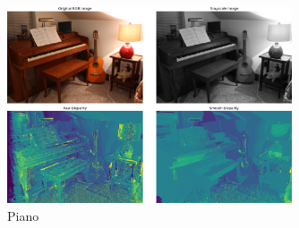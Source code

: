 \documentclass[12pt]{article}
\begin{document}
\begin{figure}[h]
    \centering
    \includegraphics[width=0.75\textwidth]{piano.png} %
    \caption*{Piano} %
\end{figure}
\end{document}
